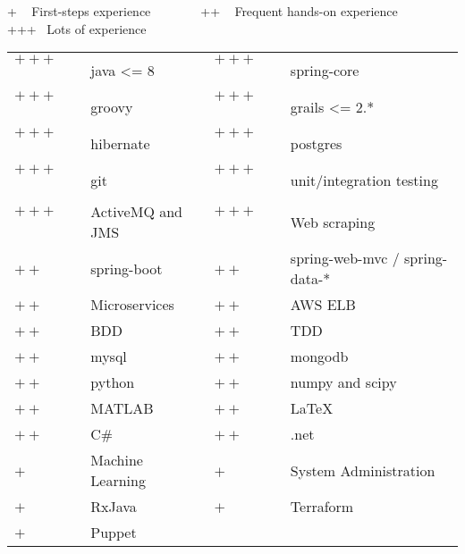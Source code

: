 
\newcommand{\plus}{$+~$~~~~}
\newcommand{\pplus}{$++~$~~~~}
\newcommand{\ppplus}{$+++$~~~~~}
\begin{cventries}
\cventry
{+ ~ First-steps experience ~~~  ~~~ ++ ~ Frequent hands-on experience ~~~  ~~~ +++ ~Lots of experience \vspace{0.1em}} %
{} %
{} %
{} %
{ %
\hspace{1em}
\setlength{\tabcolsep}{3pt}
\begin{tabular}{  l l @{\hskip 1in} l l }
           \ppplus & java <= 8 & \ppplus & spring-core \\ 
           \ppplus & groovy & \ppplus & grails <= 2.* \\
           \ppplus & hibernate & \ppplus & postgres  \\                      
           \ppplus & git & \ppplus & unit/integration testing  \\
		   \ppplus & ActiveMQ and JMS & \ppplus & Web scraping\vspace{0.7em}\\
           \pplus & spring-boot & \pplus & spring-web-mvc / spring-data-*\\ 
           \pplus & Microservices & \pplus & AWS ELB  \\ 
           \pplus & BDD &\pplus & TDD \\ 
           \pplus & mysql &\pplus & mongodb \\ 
           \pplus & python  & \pplus & numpy and scipy \\ 
		   \pplus & MATLAB & \pplus & \LaTeX \\
		   \pplus & C\# & \pplus & .net \vspace{0.7em}   \\                   
           \plus & Machine Learning &\plus & System Administration \\
           \plus & RxJava & \plus & Terraform\\
		   \plus & Puppet 
\end{tabular}
}
\end{cventries}
